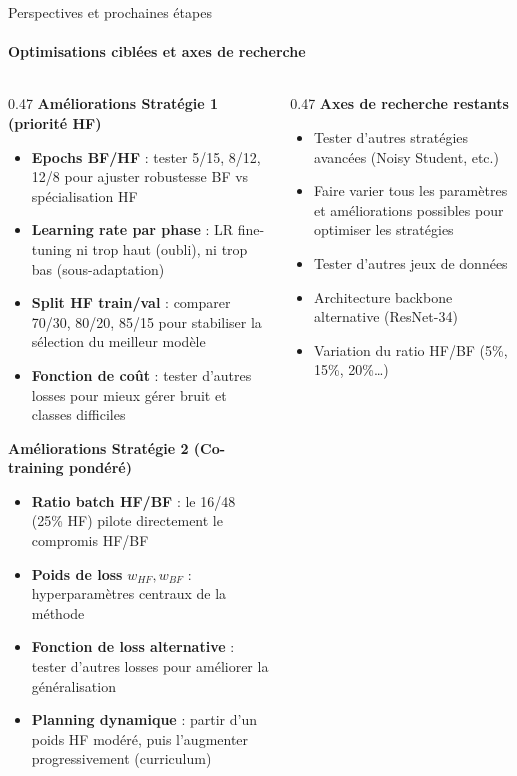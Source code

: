 \documentclass[aspectratio=169, 10pt]{beamer}
\begin{document}
\begin{frame}{Perspectives et prochaines \'{e}tapes}
\framesubtitle{Optimisations cibl\'{e}es et axes de recherche}
  \begin{columns}[T]
    \begin{column}{0.47\textwidth}
      {\footnotesize\textbf{\color{primary}Am\'{e}liorations Strat\'{e}gie 1 (priorit\'{e} HF)}}
      \begin{itemize}\scriptsize\setlength\itemsep{1pt}
        \item \textbf{Epochs BF/HF} : tester 5/15, 8/12, 12/8 pour ajuster robustesse BF vs sp\'{e}cialisation HF
        \item \textbf{Learning rate par phase} : LR fine-tuning ni trop haut (oubli), ni trop bas (sous-adaptation)
        \item \textbf{Split HF train/val} : comparer 70/30, 80/20, 85/15 pour stabiliser la s\'{e}lection du meilleur mod\`{e}le
        \item \textbf{Fonction de co\^{u}t} : tester d'autres losses pour mieux g\'{e}rer bruit et classes difficiles
      \end{itemize}

      \medskip
      {\footnotesize\textbf{\color{primary}Am\'{e}liorations Strat\'{e}gie 2 (Co-training pond\'{e}r\'{e})}}
      \begin{itemize}\scriptsize\setlength\itemsep{1pt}
        \item \textbf{Ratio batch HF/BF} : le 16/48 (25\% HF) pilote directement le compromis HF/BF
        \item \textbf{Poids de loss} $w_{HF},w_{BF}$ : hyperparam\`{e}tres centraux de la m\'{e}thode
        \item \textbf{Fonction de loss alternative} : tester d'autres losses pour am\'{e}liorer la g\'{e}n\'{e}ralisation
        \item \textbf{Planning dynamique} : partir d'un poids HF mod\'{e}r\'{e}, puis l'augmenter progressivement (curriculum)
      \end{itemize}
    \end{column}
    \begin{column}{0.47\textwidth}
      {\footnotesize\textbf{\color{primary}Axes de recherche restants}}
      \begin{itemize}\footnotesize\setlength\itemsep{2pt}
       \item Tester d'autres strat\'{e}gies avanc\'{e}es (Noisy Student, etc.)
        \item Faire varier tous les param\`{e}tres et am\'{e}liorations possibles pour optimiser les strat\'{e}gies
        \item Tester d'autres jeux de donn\'{e}es
        \item Architecture backbone alternative (ResNet-34)        \item Variation du ratio HF/BF (5\%, 15\%, 20\%\ldots)
      \end{itemize}


\end{column}
\end{columns}
\end{frame}
\end{document}
